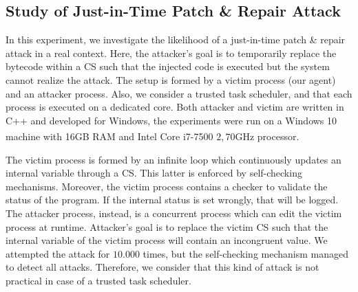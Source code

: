 
\subsection{Study of Just-in-Time Patch \& Repair Attack}
\label{sec:just-in-time}
In this experiment, we investigate the likelihood of a
just-in-time patch \& repair attack in a real context.
Here, the attacker's goal is to temporarily replace the bytecode within a CS 
such that the injected code is executed but the system cannot realize the 
attack.
The setup is formed by a victim process (\ie our agent) and an attacker 
process. %
Also, we consider a trusted task scheduler, and that each process is executed 
on a dedicated core.
Both attacker and victim are written in C++ and developed for Windows, the 
experiments were run on a Windows 10 machine with 16GB RAM and 
Intel\textsuperscript{\textregistered} Core\textsuperscript{\texttrademark} 
i7-7500 $2,70$GHz processor.

The victim process is formed by an infinite
loop which continuously updates an internal variable through a CS. This latter 
is enforced by self-checking mechanisms.
Moreover, the victim process contains a checker to validate the status of the 
program. If the internal status is set wrongly, that will be logged.
The attacker process, instead, is a concurrent process which can edit the 
victim process at runtime. Attacker's goal is to replace the victim CS such 
that the internal variable of the victim process will contain an incongruent 
value.
We attempted the attack for $10.000$ times, but the self-checking mechanism 
managed to detect all attacks.
Therefore, we consider that this kind of attack is not practical
in case of a trusted task scheduler.

